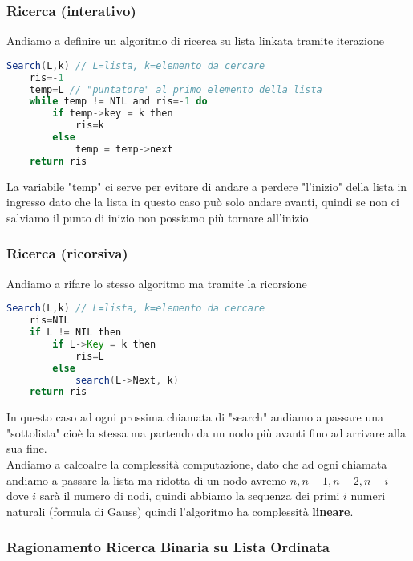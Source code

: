 \subsubsection{Ricerca (interativo)}
Andiamo a definire un algoritmo di ricerca su lista linkata tramite iterazione
\begin{lstlisting}[language=Java]
Search(L,k) // L=lista, k=elemento da cercare
	ris=-1
	temp=L // "puntatore" al primo elemento della lista
	while temp != NIL and ris=-1 do
		if temp->key = k then
			ris=k
		else
			temp = temp->next
	return ris
\end{lstlisting}
La variabile "temp" ci serve per evitare di andare a perdere "l'inizio" della lista in ingresso dato che la lista in questo caso può solo andare avanti, quindi se non ci salviamo il punto di inizio non possiamo più tornare all'inizio

\subsubsection{Ricerca (ricorsiva)}
Andiamo a rifare lo stesso algoritmo ma tramite la ricorsione
\begin{lstlisting}[language=Java]
Search(L,k) // L=lista, k=elemento da cercare
	ris=NIL
	if L != NIL then
		if L->Key = k then
			ris=L
		else
			search(L->Next, k)
	return ris
\end{lstlisting}
In questo caso ad ogni prossima chiamata di "search" andiamo a passare una "sottolista" cioè la stessa ma partendo da un nodo più avanti fino ad arrivare alla sua fine.\\
Andiamo a calcoalre la complessità computazione, dato che ad ogni chiamata andiamo a passare la lista ma ridotta di un nodo avremo $n, n-1, n-2, n-i$ dove $i$ sarà il numero di nodi, quindi abbiamo la sequenza dei primi $i$ numeri naturali (formula di Gauss) quindi l'algoritmo ha complessità \textbf{lineare}.
\subsubsection{Ragionamento Ricerca Binaria su Lista Ordinata}
\blindtext